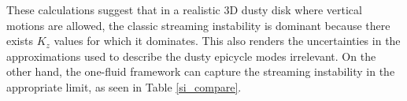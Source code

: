 These calculations suggest that in a realistic 3D dusty disk where
vertical motions are allowed, the classic streaming
instability is dominant because there exists $K_z$ values for which it
dominates. This also renders the uncertainties in the  
approximations used to describe the dusty epicycle modes
irrelevant. On the other hand, the one-fluid framework can capture the
streaming instability in the appropriate limit, as seen in Table
\ref{si_compare}. 











